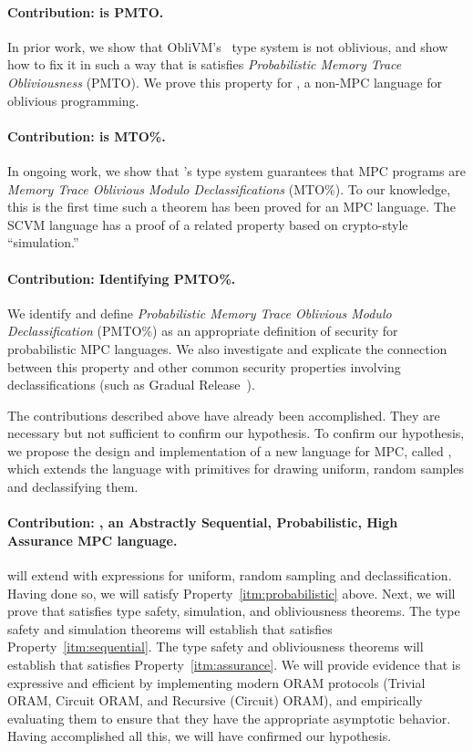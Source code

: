 \paragraph{Contribution: \obliv is PMTO.} In prior work, we show that ObliVM's~\cite{todo} type system is not oblivious,
and show how to fix it in such a way that is satisfies \emph{Probabilistic Memory Trace Obliviousness} (PMTO).
We prove this property for \obliv, a non-MPC language for oblivious programming.

\paragraph{Contribution: \mpc is MTO\%.} In ongoing work, we show that \mpc's type system guarantees that MPC programs are
\emph{Memory Trace Oblivious Modulo Declassifications} (MTO\%). To our knowledge, this is the first time such a theorem has been
proved for an MPC language. The SCVM language has a proof of a related property based on crypto-style ``simulation.''

\paragraph{Contribution: Identifying PMTO\%.} We identify and define \emph{Probabilistic Memory Trace Oblivious Modulo Declassification}
(PMTO\%) as an appropriate definition of security for probabilistic MPC languages. We also investigate and explicate the connection between
this property and other common security properties involving declassifications (such as Gradual Release~\cite{todo}).

The contributions described above have already been accomplished. They are necessary but not sufficient to confirm our hypothesis.
To confirm our hypothesis, we propose the design and implementation of a new language for MPC, called \lang, which extends the \mpc
language with primitives for drawing uniform, random samples and declassifying them.

\paragraph{Contribution: \lang, an \textbf{Abstractly Sequential}, \textbf{Probabilistic}, \textbf{High Assurance} MPC language.}
\lang will extend \mpc with expressions for uniform, random sampling and declassification. Having done so, we will satisfy
Property~\ref{itm:probabilistic} above. Next, we will prove that \lang satisfies type safety, simulation, and obliviousness theorems.
The type safety and simulation theorems will establish that \lang satisfies Property~\ref{itm:sequential}. The type safety and obliviousness
theorems will establish that \lang satisfies Property~\ref{itm:assurance}. We will provide evidence that \lang is expressive and efficient
by implementing modern ORAM protocols (Trivial ORAM, Circuit ORAM, and Recursive (Circuit) ORAM), and empirically evaluating them to ensure
that they have the appropriate asymptotic behavior. Having accomplished all this, we will have confirmed our hypothesis.

